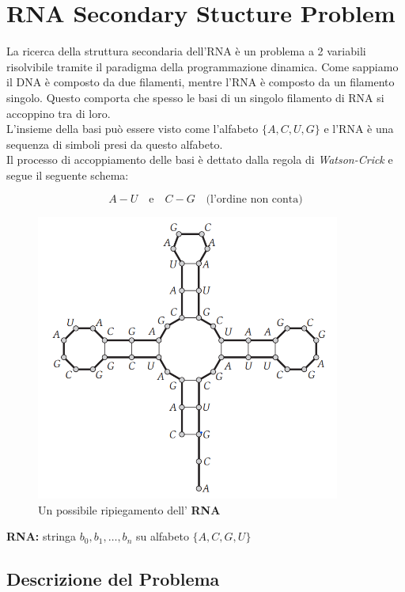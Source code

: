 \chapter{RNA Secondary Stucture Problem}

La ricerca della struttura secondaria dell'RNA è un problema a 2
variabili risolvibile tramite il paradigma della programmazione
dinamica. Come sappiamo il DNA è composto da due filamenti, mentre l'RNA
è composto da un filamento singolo. Questo comporta che spesso le basi
di un singolo filamento di RNA si accoppino tra di loro.\\

L'insieme della basi può essere visto come l'alfabeto $\{A, C, U, G\}$
e l'RNA è una sequenza di simboli presi da questo alfabeto.\\

Il processo di accoppiamento delle basi è dettato dalla regola di
\emph{Watson-Crick} e segue il seguente schema:

\[
  A - U \ \ \ \text{ e } \ \ \ C - G \ \ \ \text{ (l'ordine non conta)}
\]


\begin{figure}[H]
  \centering
  \includegraphics[width=10cm, keepaspectratio]{Programmazione_dinamica/imgs/rna1.png}
  \caption{Un possibile ripiegamento dell' \textbf{RNA}}
\end{figure}


\textbf{RNA:} stringa $b_0,b_1, \ldots, b_n$ su alfabeto $\{A, C, G, U\}$

\section{Descrizione del Problema}

